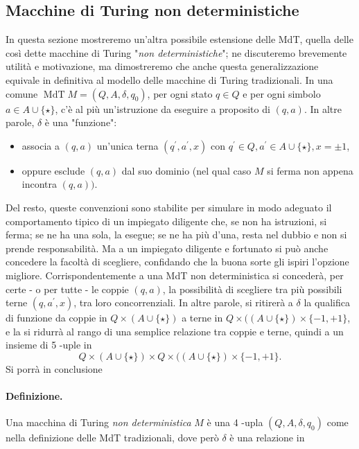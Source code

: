
\subsection{Macchine di Turing non deterministiche}

In questa sezione mostreremo un'altra possibile estensione
delle MdT, quella delle così dette macchine di Turing "\textit{non deterministiche}"; ne
discuteremo brevemente utilità e motivazione, ma dimostreremo che anche questa
generalizzazione equivale in definitiva al modello delle macchine di Turing
tradizionali. In una comune $\operatorname{MdT} M=\left(Q, A, \delta, q_0\right)$,
per ogni stato $q \in Q$ e per ogni simbolo $a \in A \cup\{\star\}$, c'è al più
un'istruzione da eseguire a proposito di $(q, a)$. In altre parole, $\delta$ è una
"funzione":
\begin{itemize}
    \item associa a $(q, a)$ un'unica terna $\left(q^{\prime}, a^{\prime},
              x\right)$ con $q^{\prime} \in Q, a^{\prime} \in A \cup\{\star\}, x=\pm 1$,
    \item oppure esclude $(q, a)$ dal suo dominio (nel qual caso $M$ si ferma non appena incontra $(q,
              a))$.
\end{itemize}

Del resto, queste convenzioni sono stabilite per simulare in modo adeguato il
comportamento tipico di un impiegato diligente che, se non ha istruzioni, si ferma;
se ne ha una sola, la esegue; se ne ha più d'una, resta nel dubbio e non si prende
responsabilità. Ma a un impiegato diligente e fortunato si può anche concedere la
facoltà di scegliere, confidando che la buona sorte gli ispiri l'opzione migliore.
Corrispondentemente a una MdT non deterministica si concederà, per certe - o per
tutte - le coppie $(q, a)$, la possibilità di scegliere tra più possibili terne
$\left(q, a^{\prime}, x\right)$, tra loro concorrenziali. In altre parole, si
ritirerà a $\delta$ la qualifica di funzione da coppie in $Q \times(A \cup\{\star\})$
a terne in $Q \times((A \cup\{\star\}) \times\{-1,+1\}$, e la si ridurrà al rango di
una semplice relazione tra coppie e terne, quindi a un insieme di 5 -uple in
$$
    Q \times(A \cup\{\star\}) \times Q \times((A \cup\{\star\}) \times\{-1,+1\} .
$$
Si porrà in conclusione

\paragraph{Definizione.} Una macchina di Turing \textit{non deterministica} $M$ è una 4 -upla
$(Q, A, \delta, q_0)$ come nella definizione delle MdT tradizionali,
dove però $\delta$ è una relazione in

